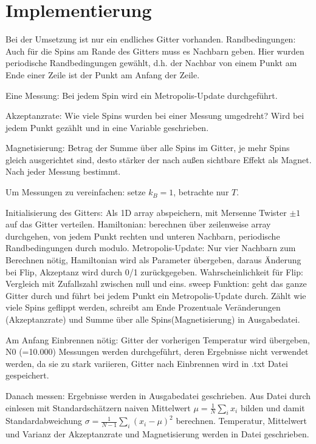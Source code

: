 \documentclass{scrreprt}
\begin{document}
	
		
	\chapter{Implementierung}
	Bei der Umsetzung ist nur ein endliches Gitter vorhanden.
	Randbedingungen: Auch für die Spins am Rande des Gitters muss es Nachbarn geben. Hier wurden periodische Randbedingungen gewählt, d.h. der Nachbar von einem Punkt am Ende einer Zeile ist der Punkt am Anfang der Zeile.
	
	Eine Messung: Bei jedem Spin wird ein Metropolis-Update durchgeführt.
	
	Akzeptanzrate: Wie viele Spins wurden bei einer Messung umgedreht? Wird bei jedem Punkt gezählt und in eine Variable geschrieben.
	
	Magnetisierung: Betrag der Summe über alle Spins im Gitter, je mehr Spins gleich ausgerichtet sind, desto stärker der nach außen sichtbare Effekt als Magnet. Nach jeder Messung bestimmt.
	
	Um Messungen zu vereinfachen: setze $k_B=1$, betrachte nur $T$.
		
	Initialisierung des Gitters: Als 1D array abspeichern, mit Mersenne Twister $\pm1$ auf das Gitter verteilen.
	Hamiltonian: berechnen über zeilenweise array durchgehen, von jedem Punkt rechten und unteren Nachbarn, periodische Randbedingungen durch modulo.
	Metropolis-Update: Nur vier Nachbarn zum Berechnen nötig, Hamiltonian wird als Parameter übergeben, daraus Änderung bei Flip, Akzeptanz wird durch 0/1 zurückgegeben. Wahrscheinlichkeit für Flip: Vergleich mit Zufallszahl zwischen null und eins.
	sweep Funktion: geht das ganze Gitter durch und führt bei jedem Punkt ein Metropolis-Update durch. Zählt wie viele Spins geflippt werden, schreibt am Ende Prozentuale Veränderungen (Akzeptanzrate) und Summe über alle Spins(Magnetisierung) in Ausgabedatei.
	
	Am Anfang Einbrennen nötig: Gitter der vorherigen Temperatur wird übergeben, N0 (=10.000) Messungen werden durchgeführt, deren Ergebnisse nicht verwendet werden, da sie zu stark variieren, Gitter nach Einbrennen wird in .txt Datei gespeichert.
	
	Danach messen: Ergebnisse werden in Ausgabedatei geschrieben.
	Aus Datei durch einlesen mit Standardschätzern naiven Mittelwert $\mu=\frac{1}{N}\sum_{i} x_i$ bilden und damit Standardabweichung $\sigma=\frac{1}{N-1}\sum_{i}(x_i-\mu)^2$ berechnen. Temperatur, Mittelwert und Varianz der Akzeptanzrate und Magnetisierung werden in Datei geschrieben.
	
\end{document}
